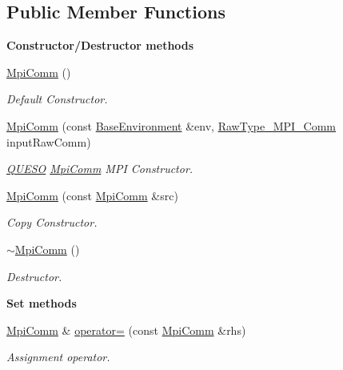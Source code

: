 \subsection*{Public Member Functions}
\begin{Indent}{\bf Constructor/\-Destructor methods}\par
\begin{DoxyCompactItemize}
\item 
\hyperlink{class_q_u_e_s_o_1_1_mpi_comm_a34237212169683b2df357b6b710d2a38}{Mpi\-Comm} ()
\begin{DoxyCompactList}\small\item\em Default Constructor. \end{DoxyCompactList}\item 
\hyperlink{class_q_u_e_s_o_1_1_mpi_comm_a975b6dcbce05a62ec4c4034ff200a6fe}{Mpi\-Comm} (const \hyperlink{class_q_u_e_s_o_1_1_base_environment}{Base\-Environment} \&env, \hyperlink{namespace_q_u_e_s_o_af48741a7e6d7897e9e96e0f5bb26cfd7}{Raw\-Type\-\_\-\-M\-P\-I\-\_\-\-Comm} input\-Raw\-Comm)
\begin{DoxyCompactList}\small\item\em \hyperlink{namespace_q_u_e_s_o}{Q\-U\-E\-S\-O} \hyperlink{class_q_u_e_s_o_1_1_mpi_comm}{Mpi\-Comm} M\-P\-I Constructor. \end{DoxyCompactList}\item 
\hyperlink{class_q_u_e_s_o_1_1_mpi_comm_a740705f407d4cd32ebf66fd797977209}{Mpi\-Comm} (const \hyperlink{class_q_u_e_s_o_1_1_mpi_comm}{Mpi\-Comm} \&src)
\begin{DoxyCompactList}\small\item\em Copy Constructor. \end{DoxyCompactList}\item 
\hyperlink{class_q_u_e_s_o_1_1_mpi_comm_a2bf46779dc9fe47cf90cb205285e8a99}{$\sim$\-Mpi\-Comm} ()
\begin{DoxyCompactList}\small\item\em Destructor. \end{DoxyCompactList}\end{DoxyCompactItemize}
\end{Indent}
\begin{Indent}{\bf Set methods}\par
\begin{DoxyCompactItemize}
\item 
\hyperlink{class_q_u_e_s_o_1_1_mpi_comm}{Mpi\-Comm} \& \hyperlink{class_q_u_e_s_o_1_1_mpi_comm_ac72ab4b4a0181c4e37e6e6edfa6b696a}{operator=} (const \hyperlink{class_q_u_e_s_o_1_1_mpi_comm}{Mpi\-Comm} \&rhs)
\begin{DoxyCompactList}\small\item\em Assignment operator. \end{DoxyCompactList}\end{DoxyCompactItemize}
\end{Indent}
